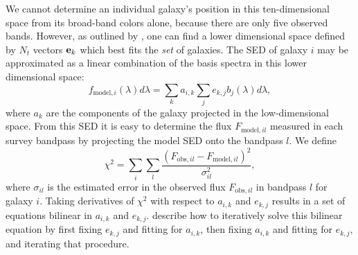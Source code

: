 \documentclass[10pt,preprint]{aastex}
\newcommand{\vv}[1]{{\bf #1}}
\begin{document}
We cannot determine an individual galaxy's position in this
ten-dimensional space from its broad-band colors alone, because there
are only five observed bands. However, as outlined by
\citet{csabai00a}, one can find a lower dimensional space defined by
$N_t$ vectors $\vv{e}_k$ which best fits the {\it set} of
galaxies. The SED of galaxy $i$ may be approximated as a linear
combination of the basis spectra in this lower dimensional space:
\begin{equation}
\label{lincomb}
f_{\mathrm{model},i}(\lambda) d\lambda = 
\sum_k a_{i,k} \sum_j e_{k,j} b_j(\lambda) d\lambda,
\end{equation}
where $a_k$ are the components of the galaxy projected in the
low-dimensional space. From this SED it is easy to determine the flux
$F_{\mathrm{model},il}$ measured in each survey bandpass by projecting
the model SED onto the bandpass $l$. We define
\begin{equation}
\chi^2 = \sum_i \sum_l
\frac{(F_{\mathrm{obs},il}-F_{\mathrm{model},il})^2}{\sigma_{il}^2},
\end{equation}
where $\sigma_{il}$ is the estimated error in the observed flux
$F_{\mathrm{obs},il}$ in bandpass $l$ for galaxy $i$. Taking
derivatives of $\chi^2$ with respect to $a_{i,k}$ and $e_{k,j}$
results in a set of equations bilinear in $a_{i,k}$ and $e_{k,j}$.
\citet{csabai00a} describe how to iteratively solve this bilinear
equation by first fixing $e_{k,j}$ and fitting for $a_{i,k}$, then
fixing $a_{i,k}$ and fitting for $e_{k,j}$, and iterating that
procedure.

\end{document}
